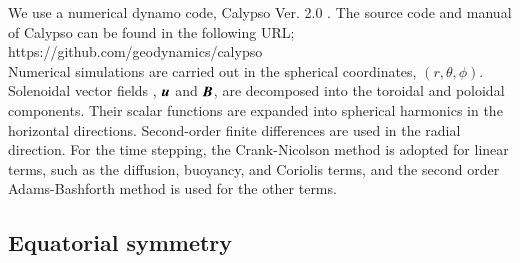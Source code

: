 We use a numerical dynamo code, Calypso Ver. 2.0 \cite{Matsui:2014}.
%
The source code and manual of Calypso can be found in the following URL;\\
https://github.com/geodynamics/calypso\\
%
Numerical simulations are carried out in the spherical coordinates, $(r, \theta, \phi)$.
Solenoidal vector fields , $\mbox{\boldmath$u$}$ and $\mbox{\boldmath$B$}$, are decomposed into the toroidal and poloidal components.
Their scalar functions are expanded into spherical harmonics in the horizontal directions.
Second-order finite differences are used in the radial direction.
For the time stepping, the Crank-Nicolson method is adopted for linear terms, such as the diffusion, buoyancy, and Coriolis terms, and the second order Adams-Bashforth method is used for the other terms.

\subsection{Equatorial symmetry}

